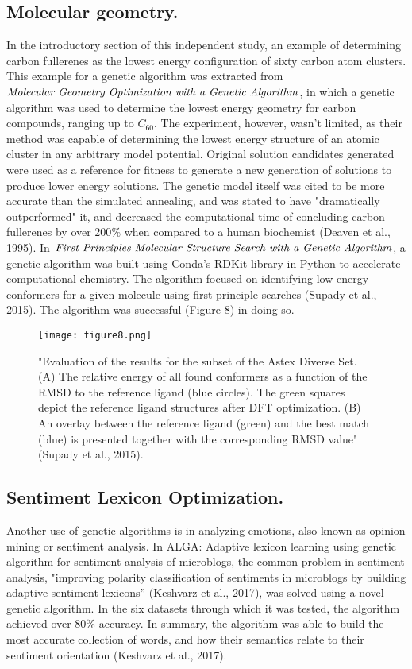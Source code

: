 \documentclass{JMLFS}
\begin{document}
\subsection {Molecular geometry.} In the introductory section of this independent study, an example of determining carbon fullerenes as the lowest energy configuration of sixty carbon atom clusters. This example for a genetic algorithm was extracted from $\emph{Molecular Geometry Optimization with a Genetic Algorithm}$, in which a genetic algorithm was used to determine the lowest energy geometry for carbon compounds, ranging up to $C_60$. The experiment, however, wasn't limited, as their method was capable of determining the lowest energy structure of an atomic cluster in any arbitrary model potential. Original solution candidates generated were used as a reference for fitness to generate a new generation of solutions to produce lower energy solutions. The genetic model itself was cited to be more accurate than the simulated annealing, and was stated to have "dramatically outperformed" it, and decreased the computational time of concluding carbon fullerenes by over 200$\%$ when compared to a human biochemist (Deaven et al., 1995). In $\emph{First-Principles Molecular Structure Search with a Genetic Algorithm}$, a genetic algorithm was built using Conda's RDKit library in Python to accelerate computational chemistry. The algorithm focused on identifying low-energy conformers for a given molecule using first principle searches (Supady et al., 2015). The algorithm was successful (Figure 8) in doing so.\begin{figure}[ht]
\centering
\texttt{[image: figure8.png]}
\caption{"Evaluation of the results for the subset of the Astex Diverse Set. (A) The relative energy of all found conformers as a function of the RMSD to the reference ligand (blue circles). The green squares depict the reference ligand structures after DFT optimization. (B) An overlay between the reference ligand (green) and the best match (blue) is presented together with the corresponding RMSD value" (Supady et al., 2015).}
\end{figure}\subsection{Sentiment Lexicon Optimization.} Another use of genetic algorithms is in analyzing emotions, also known as opinion mining or sentiment analysis. In ALGA: Adaptive lexicon learning using genetic algorithm for sentiment analysis of microblogs, the common problem in sentiment analysis, "improving polarity classification of sentiments in microblogs by building adaptive sentiment lexicons'' (Keshvarz et al., 2017), was solved using a novel genetic algorithm. In the six datasets through which it was tested, the algorithm achieved over 80$\%$ accuracy. In summary, the algorithm was able to build the most accurate collection of words, and how their semantics relate to their sentiment orientation (Keshvarz et al., 2017).
\end{document}
